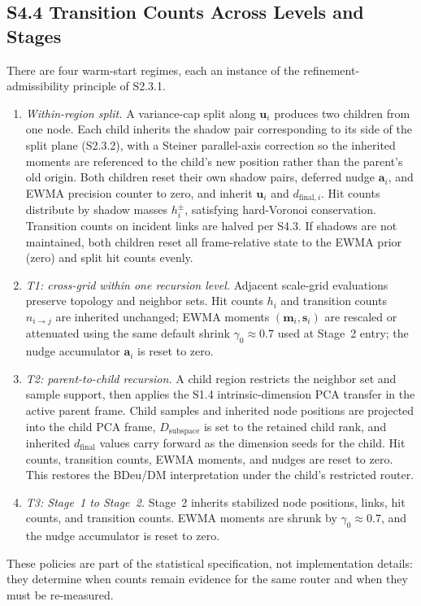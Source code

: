 \documentclass[11pt]{article}
\begin{document}
\subsection*{S4.4 Transition Counts Across Levels and Stages}
\label{sec:si-transition-policies}
There are four warm-start regimes, each an instance of the refinement-admissibility principle of S2.3.1.
\begin{enumerate}[leftmargin=1.5em]
  \item[\emph{T0.}] \emph{Within-region split.} A variance-cap split along $\mathbf u_i$ produces two children from one node. Each child inherits the shadow pair corresponding to its side of the split plane (S2.3.2), with a Steiner parallel-axis correction so the inherited moments are referenced to the child's new position rather than the parent's old origin. Both children reset their own shadow pairs, deferred nudge $\mathbf a_i$, and EWMA precision counter to zero, and inherit $\mathbf u_i$ and $d_{\mathrm{final},i}$. Hit counts distribute by shadow masses $h_i^\pm$, satisfying hard-Voronoi conservation. Transition counts on incident links are halved per S4.3. If shadows are not maintained, both children reset all frame-relative state to the EWMA prior (zero) and split hit counts evenly.
  \item \emph{T1: cross-grid within one recursion level.} Adjacent scale-grid evaluations preserve topology and neighbor sets. Hit counts $h_i$ and transition counts $n_{i\to j}$ are inherited unchanged; EWMA moments $(\mathbf m_i,\mathbf s_i)$ are rescaled or attenuated using the same default shrink $\gamma_0\approx0.7$ used at Stage~2 entry; the nudge accumulator $\mathbf a_i$ is reset to zero.
  \item \emph{T2: parent-to-child recursion.} A child region restricts the neighbor set and sample support, then applies the S1.4 intrinsic-dimension PCA transfer in the active parent frame. Child samples and inherited node positions are projected into the child PCA frame, $D_{\mathrm{subspace}}$ is set to the retained child rank, and inherited $d_{\mathrm{final}}$ values carry forward as the dimension seeds for the child. Hit counts, transition counts, EWMA moments, and nudges are reset to zero. This restores the BDeu/DM interpretation under the child's restricted router.
  \item \emph{T3: Stage~1 to Stage~2.} Stage~2 inherits stabilized node positions, links, hit counts, and transition counts. EWMA moments are shrunk by $\gamma_0\approx0.7$, and the nudge accumulator is reset to zero.
\end{enumerate}
These policies are part of the statistical specification, not implementation details: they determine when counts remain evidence for the same router and when they must be re-measured.
\end{document}
